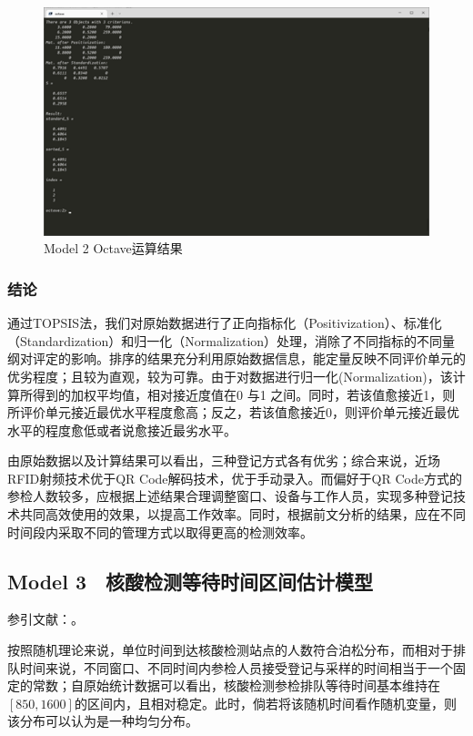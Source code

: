 \documentclass[
  journal=,
  manuscript=,
  year=2022,
  volume=01,
]{cup-journal}
\begin{document}
\begin{figure}[hbt!]
	\centering
	\includegraphics[width=0.75\linewidth]{fig/res2.png}
	\caption{Model 2 Octave运算结果}
	\label{fig_res2}
\end{figure}

\subsubsection{结论}

\par 通过TOPSIS法，我们对原始数据进行了正向指标化（Positivization）、标准化（Standardization）和归一化（Normalization）处理，消除了不同指标的不同量纲对评定的影响。排序的结果充分利用原始数据信息，能定量反映不同评价单元的优劣程度；且较为直观，较为可靠。由于对数据进行归一化(Normalization)，该计算所得到的加权平均值，相对接近度值在0 与1 之间。同时，若该值愈接近1，则所评价单元接近最优水平程度愈高；反之，若该值愈接近0，则评价单元接近最优水平的程度愈低或者说愈接近最劣水平。
\par 由原始数据以及计算结果可以看出，三种登记方式各有优劣；综合来说，近场RFID射频技术优于QR Code解码技术，优于手动录入。而偏好于QR Code方式的参检人数较多，应根据上述结果合理调整窗口、设备与工作人员，实现多种登记技术共同高效使用的效果，以提高工作效率。同时，根据前文分析的结果，应在不同时间段内采取不同的管理方式以取得更高的检测效率。

\subsection{Model 3　核酸检测等待时间区间估计模型}
\noindent 参引文献：\cite{yu2014improved}。
\par 按照随机理论来说，单位时间到达核酸检测站点的人数符合泊松分布，而相对于排队时间来说，不同窗口、不同时间内参检人员接受登记与采样的时间相当于一个固定的常数；自原始统计数据可以看出，核酸检测参检排队等待时间基本维持在$\left [ 850,1600 \right ] $的区间内，且相对稳定。此时，倘若将该随机时间看作随机变量，则该分布可以认为是一种均匀分布。
\end{document}
